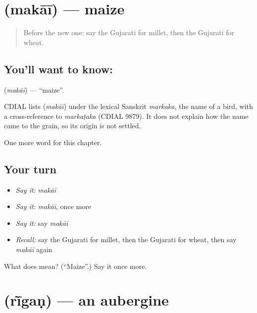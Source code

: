 \section[\texorpdfstring{\gu{મકાઈ} (makāī)}{મકાઈ (makāī)}]{ (makāī) — maize}

\label{lesson:GU-C114-makai}



\begin{quote}
Before the new one: say the Gujarati for millet, then the Gujarati for wheat.
\end{quote}

\subsection*{You'll want to know: }
\textbf{} (\emph{makāī}) — \textquotedblleft{}maize\textquotedblright{}.

\begin{cousinweb}
CDIAL lists \textbf{} (\emph{makāī}) under the lexical Sanskrit \emph{markaka}, the name of a bird, with a cross-reference to \emph{markaṭaka} (CDIAL 9879). It does not explain how the name came to the grain, so its origin is not settled.
\end{cousinweb}

\begin{grammarlens}[title={What you've built}]
One more word for this chapter.
\end{grammarlens}

\subsection*{Your turn}
\begin{itemize}
\raggedright
  \item \emph{Say it:} \emph{makāī}
  \item \emph{Say it:} \emph{makāī}, once more
  \item \emph{Say it:} say \emph{makāī}
  \item \emph{Recall:} say the Gujarati for millet, then the Gujarati for wheat, then say \emph{makāī} again
\end{itemize}

\begin{tcolorbox}[breakable,colback=teal!4,colframe=teal!35!black,title={Before you move on}]
What does  mean? (\textquotedblleft{}Maize\textquotedblright{}.) Say it once more.
\end{tcolorbox}
\section[\texorpdfstring{\gu{રીંગણ} (rī̃gaṇ)}{રીંગણ (rī̃gaṇ)}]{ (rī̃gaṇ) — an aubergine}

